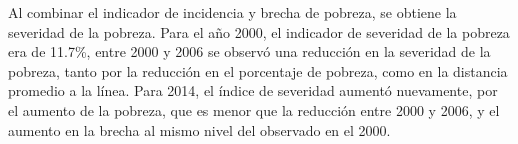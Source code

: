 Al combinar el indicador de incidencia y brecha de pobreza, se obtiene la severidad de la pobreza. Para el año 2000, el indicador de severidad de la pobreza era de 11.7\%, entre 2000 y 2006 se observó una reducción en la severidad de la pobreza, tanto por la reducción en el porcentaje de pobreza, como en la distancia promedio a la línea. Para 2014, el índice de severidad aumentó nuevamente, por el aumento de la pobreza, que es menor que la reducción entre 2000 y 2006, y el aumento en la brecha al mismo nivel del observado en el 2000.